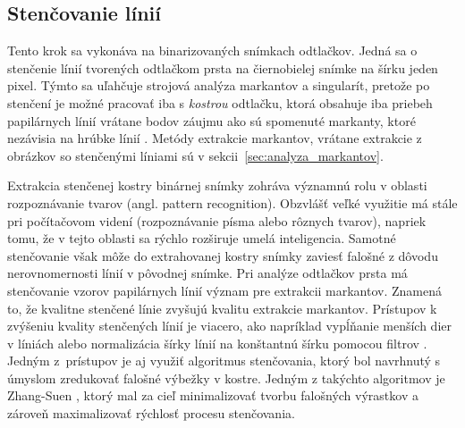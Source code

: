   \subsection{Stenčovanie línií} \label{sec:stencovanie}
  Tento krok sa vykonáva na binarizovaných snímkach odtlačkov. Jedná sa o stenčenie línií tvorených odtlačkom prsta na čiernobielej snímke na šírku
  jeden pixel. Týmto sa uľahčuje strojová analýza markantov a singularít, pretože po stenčení je možné pracovať iba s \emph{kostrou} odtlačku,
  ktorá obsahuje iba priebeh papilárnych línií vrátane bodov záujmu ako sú spomenuté markanty, ktoré nezávisia na hrúbke línií \cite{Handbook}.
  Metódy extrakcie markantov, vrátane extrakcie z obrázkov so stenčenými líniami sú v sekcii~{\ref{sec:analyza_markantov}}.
  
  Extrakcia stenčenej kostry binárnej snímky zohráva významnú rolu v oblasti rozpoznávanie tvarov (angl. pattern recognition). Obzvlášť veľké využitie má stále
  pri počítačovom videní (rozpoznávanie písma alebo rôznych tvarov), napriek tomu, že v tejto oblasti sa rýchlo rozširuje umelá inteligencia.
  Samotné stenčovanie však môže do extrahovanej kostry snímky zaviesť falošné  z dôvodu nerovnomernosti línií v pôvodnej snímke.
  Pri analýze odtlačkov prsta má stenčovanie vzorov papilárnych línií význam pre extrakcii markantov. Znamená to, že kvalitne stenčené línie zvyšujú kvalitu
  extrakcie markantov. Prístupov k zvýšeniu kvality stenčených línií je viacero, ako napríklad vypĺňanie menších dier v líniách alebo normalizácia šírky
  línií na konštantnú šírku pomocou filtrov \cite{Handbook}. Jedným z~prístupov je aj využiť algoritmus stenčovania, ktorý bol navrhnutý s úmyslom zredukovať
  falošné výbežky v kostre. Jedným z takýchto algoritmov je Zhang-Suen \cite{ZhangSuen_thinning}, ktorý mal za cieľ minimalizovať tvorbu falošných výrastkov
  a zároveň maximalizovať rýchlosť procesu stenčovania.
  
